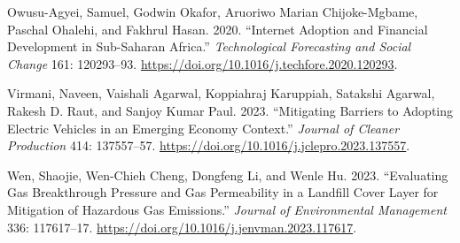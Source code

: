 \documentclass[
  12pt,
]{article}
\newlength{\cslhangindent}
\newenvironment{CSLReferences}[2] %
 {\begin{list}{}{%
  \setlength{\itemindent}{0pt}
  \setlength{\leftmargin}{0pt}
  \setlength{\parsep}{0pt}
  \ifodd #1
   \setlength{\leftmargin}{\cslhangindent}
   \setlength{\itemindent}{-1\cslhangindent}
  \fi
  \setlength{\itemsep}{#2\baselineskip}}}
 {\end{list}}
\begin{document}
\begin{CSLReferences}{1}{0}
Owusu-Agyei, Samuel, Godwin Okafor, Aruoriwo Marian Chijoke-Mgbame,
Paschal Ohalehi, and Fakhrul Hasan. 2020. {``Internet Adoption and
Financial Development in Sub-Saharan Africa.''} \emph{Technological
Forecasting and Social Change} 161: 120293--93.
\url{https://doi.org/10.1016/j.techfore.2020.120293}.

Virmani, Naveen, Vaishali Agarwal, Koppiahraj Karuppiah, Satakshi
Agarwal, Rakesh D. Raut, and Sanjoy Kumar Paul. 2023. {``Mitigating
Barriers to Adopting Electric Vehicles in an Emerging Economy
Context.''} \emph{Journal of Cleaner Production} 414: 137557--57.
\url{https://doi.org/10.1016/j.jclepro.2023.137557}.

Wen, Shaojie, Wen-Chieh Cheng, Dongfeng Li, and Wenle Hu. 2023.
{``Evaluating Gas Breakthrough Pressure and Gas Permeability in a
Landfill Cover Layer for Mitigation of Hazardous Gas Emissions.''}
\emph{Journal of Environmental Management} 336: 117617--17.
\url{https://doi.org/10.1016/j.jenvman.2023.117617}.

\end{CSLReferences}
\end{document}
